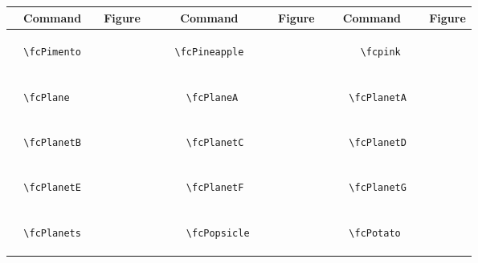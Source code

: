 \documentclass[x11names]{article}
\begin{document}
\begin{table}[H]\centering\begin{tabular}{|c|c|c|c|c|c|}\hline{\bf Command} & {\bf Figure} & {\bf Command} & {\bf Figure} & {\bf Command} & {\bf Figure}\\	\hline	&\multirow{5}{*}{	\fcPimento	[scale=0.4]} & &\multirow{5}{*}{	\fcPineapple	[scale=0.8]} & &\multirow{5}{*}{	\fcpink	[scale=0.4]}\\	& & & & & \\	& & & & & \\	\verb|	\fcPimento	| & & \verb|	\fcPineapple	| & & \verb|	\fcpink	| & \\	& & & & & \\	& & & & & \\	& & & & & \\	\hline									
		&\multirow{5}{*}{	\fcPlane	[scale=0.8]} & &\multirow{5}{*}{	\fcPlaneA	[scale=0.8]} & &\multirow{5}{*}{	\fcPlanetA	[scale=0.4]}\\	& & & & & \\	& & & & & \\	\verb|	\fcPlane	| & & \verb|	\fcPlaneA	| & & \verb|	\fcPlanetA	| & \\	& & & & & \\	& & & & & \\	& & & & & \\	\hline									
		&\multirow{5}{*}{	\fcPlanetB	[scale=0.4]} & &\multirow{5}{*}{	\fcPlanetC	[scale=0.4]} & &\multirow{5}{*}{	\fcPlanetD	[scale=0.4]}\\	& & & & & \\	& & & & & \\	\verb|	\fcPlanetB	| & & \verb|	\fcPlanetC	| & & \verb|	\fcPlanetD	| & \\	& & & & & \\	& & & & & \\	& & & & & \\	\hline									
		&\multirow{5}{*}{	\fcPlanetE	[scale=0.4]} & &\multirow{5}{*}{	\fcPlanetF	[scale=0.4]} & &\multirow{5}{*}{	\fcPlanetG	[scale=0.4]}\\	& & & & & \\	& & & & & \\	\verb|	\fcPlanetE	| & & \verb|	\fcPlanetF	| & & \verb|	\fcPlanetG	| & \\	& & & & & \\	& & & & & \\	& & & & & \\	\hline									
		&\multirow{5}{*}{	\fcPlanets	[scale=0.4]} & &\multirow{5}{*}{	\fcPopsicle	[scale=0.4]} & &\multirow{5}{*}{	\fcPotato	[scale=0.4]}\\	& & & & & \\	& & & & & \\	\verb|	\fcPlanets	| & & \verb|	\fcPopsicle	| & & \verb|	\fcPotato	| & \\	& & & & & \\	& & & & & \\	& & & & & \\	\hline									

\end{tabular}
\end{table}
\end{document}
